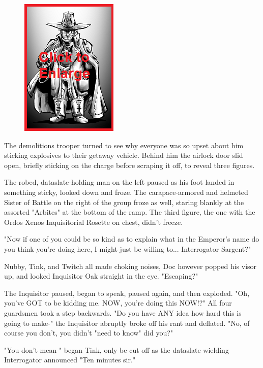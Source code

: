 \begin{figure}
	\begin{center}
		\includegraphics[width=\figwidth]{pics/20/10.png}
	\end{center}
\end{figure}

The demolitions trooper turned to see why everyone was so upset about him sticking explosives to their getaway vehicle. 
Behind him the airlock door slid open, briefly sticking on the charge before scraping it off, to reveal three figures. 


The robed, dataslate-holding man on the left paused as his foot landed in something sticky, looked down and froze. 
The carapace-armored and helmeted Sister of Battle on the right of the group froze as well, staring blankly at the assorted "Arbites" at the bottom of the ramp. 
The third figure, the one with the Ordos Xenos Inquisitorial Rosette on chest, didn't freeze. 


"Now if one of you could be so kind as to explain what in the Emperor's name do you think you're doing here, I might just be willing to... 
Interrogator Sargent?"

Nubby, Tink, and Twitch all made choking noises, Doc however popped his visor up, and looked Inquisitor Oak straight in the eye. 
"Escaping?"

The Inquisitor paused, began to speak, paused again, and then exploded. 
"Oh, you've GOT to be kidding me. 
NOW, you're doing this NOW!?" All four guardsmen took a step backwards. 
"Do you have ANY idea how hard this is going to make-" the Inquisitor abruptly broke off his rant and deflated. 
"No, of course you don't, you didn't "need to know" did you?"

"You don't mean-" began Tink, only be cut off as the dataslate wielding Interrogator announced "Ten minutes sir."

